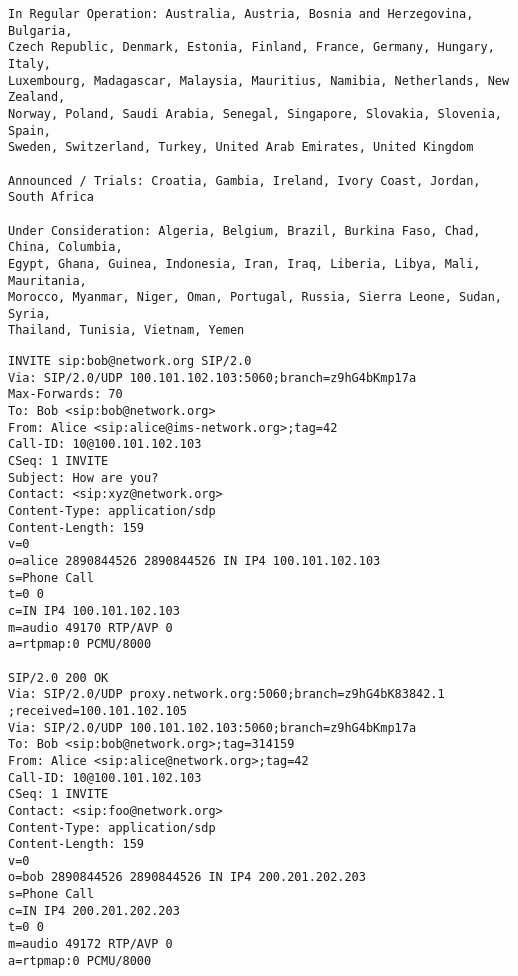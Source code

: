
\begin{appendix}

\begin{lstlisting}
In Regular Operation: Australia, Austria, Bosnia and Herzegovina, Bulgaria,
Czech Republic, Denmark, Estonia, Finland, France, Germany, Hungary, Italy,
Luxembourg, Madagascar, Malaysia, Mauritius, Namibia, Netherlands, New Zealand,
Norway, Poland, Saudi Arabia, Senegal, Singapore, Slovakia, Slovenia, Spain,
Sweden, Switzerland, Turkey, United Arab Emirates, United Kingdom

Announced / Trials: Croatia, Gambia, Ireland, Ivory Coast, Jordan, South Africa

Under Consideration: Algeria, Belgium, Brazil, Burkina Faso, Chad, China, Columbia,
Egypt, Ghana, Guinea, Indonesia, Iran, Iraq, Liberia, Libya, Mali, Mauritania,
Morocco, Myanmar, Niger, Oman, Portugal, Russia, Sierra Leone, Sudan, Syria,
Thailand, Tunisia, Vietnam, Yemen
\end{lstlisting}

\newpage


\begin{lstlisting}
INVITE sip:bob@network.org SIP/2.0
Via: SIP/2.0/UDP 100.101.102.103:5060;branch=z9hG4bKmp17a
Max-Forwards: 70
To: Bob <sip:bob@network.org>
From: Alice <sip:alice@ims-network.org>;tag=42
Call-ID: 10@100.101.102.103
CSeq: 1 INVITE
Subject: How are you?
Contact: <sip:xyz@network.org>
Content-Type: application/sdp
Content-Length: 159
v=0
o=alice 2890844526 2890844526 IN IP4 100.101.102.103
s=Phone Call
t=0 0
c=IN IP4 100.101.102.103
m=audio 49170 RTP/AVP 0
a=rtpmap:0 PCMU/8000

SIP/2.0 200 OK
Via: SIP/2.0/UDP proxy.network.org:5060;branch=z9hG4bK83842.1
;received=100.101.102.105
Via: SIP/2.0/UDP 100.101.102.103:5060;branch=z9hG4bKmp17a
To: Bob <sip:bob@network.org>;tag=314159
From: Alice <sip:alice@network.org>;tag=42
Call-ID: 10@100.101.102.103
CSeq: 1 INVITE
Contact: <sip:foo@network.org>
Content-Type: application/sdp
Content-Length: 159
v=0
o=bob 2890844526 2890844526 IN IP4 200.201.202.203
s=Phone Call
c=IN IP4 200.201.202.203
t=0 0
m=audio 49172 RTP/AVP 0
a=rtpmap:0 PCMU/8000
\end{lstlisting}


\end{appendix}

\endinput

